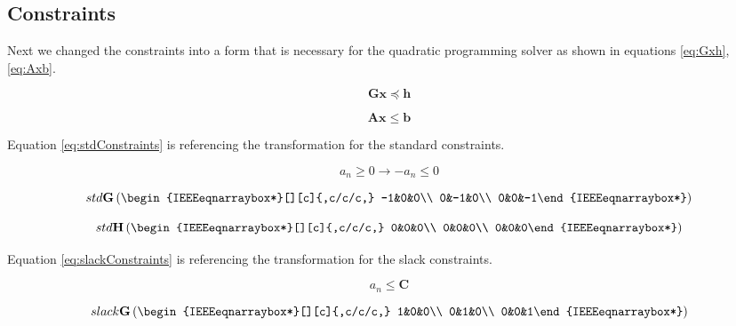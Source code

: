\documentclass[journal]{IEEEtran}
\begin{document}
    \subsection{Constraints}

    Next we changed the constraints into a form that is necessary for the quadratic programming solver as shown in equations \ref{eq:Gxh}, \ref{eq:Axb}.

    \begin{equation}
    \label{eq:Gxh}
    \mathbf{G} \mathbf{x} \preceq \mathbf{h}
    \end{equation}

    \begin{equation}
    \label{eq:Axb}
    \mathbf{A} \mathbf{x} \leq \mathbf{b}
    \end{equation}

    Equation \ref{eq:stdConstraints} is referencing the transformation for the standard constraints.

    \begin{equation}
    \label{eq:stdConstraints}
    a_n \geq 0 \rightarrow -a_n \leq 0
    \end{equation}

    \begin{equation}
    std\mathbf{G} \left(\begin{IEEEeqnarraybox*}[][c]{,c/c/c,}
    -1&0&0\\
    0&-1&0\\
    0&0&-1%
    \end{IEEEeqnarraybox*}\right)
    \end{equation}

    \begin{equation}
    std\mathbf{H} \left(\begin{IEEEeqnarraybox*}[][c]{,c/c/c,}
    0&0&0\\
    0&0&0\\
    0&0&0%
    \end{IEEEeqnarraybox*}\right)
    \end{equation}

    Equation \ref{eq:slackConstraints} is referencing the transformation for the slack constraints.

    \begin{equation}
    \label{eq:slackConstraints}
    a_n \leq \mathbf{C}
    \end{equation}

    \begin{equation}
    slack\mathbf{G} \left(\begin{IEEEeqnarraybox*}[][c]{,c/c/c,}
    1&0&0\\
    0&1&0\\
    0&0&1%
    \end{IEEEeqnarraybox*}\right)
    \end{equation}
\end{document}
